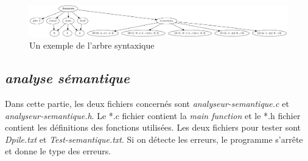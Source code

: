\documentclass[a4paper,14pt,UTF8]{article}
\begin{document}
\begin{itemize}
		\par
		
		\begin{figure}[H]
			\setlength{\abovecaptionskip}{-0.cm}
			
			\begin{center}
				\includegraphics[width=16cm]{arbre_syntaxique}
			\end{center}
			\caption{Un exemple de l'arbre syntaxique}
		\end{figure}
		
	\end{itemize} 
   
	\subsection{\textit{analyse sémantique}}
	
	\quad Dans cette partie, les deux fichiers concernés sont \textit{analyseur-semantique.c} et \textit{analyseur-semantique.h}. Le *.c fichier contient la \textit{main function} et le *.h fichier contient les définitions des fonctions utilisées. Les deux fichiers pour tester sont \textit{Dpile.txt} et \textit{Test-semantique.txt}. Si on détecte les erreurs, le programme s'arrête et donne le type des erreurs.  \par 
\end{document}
